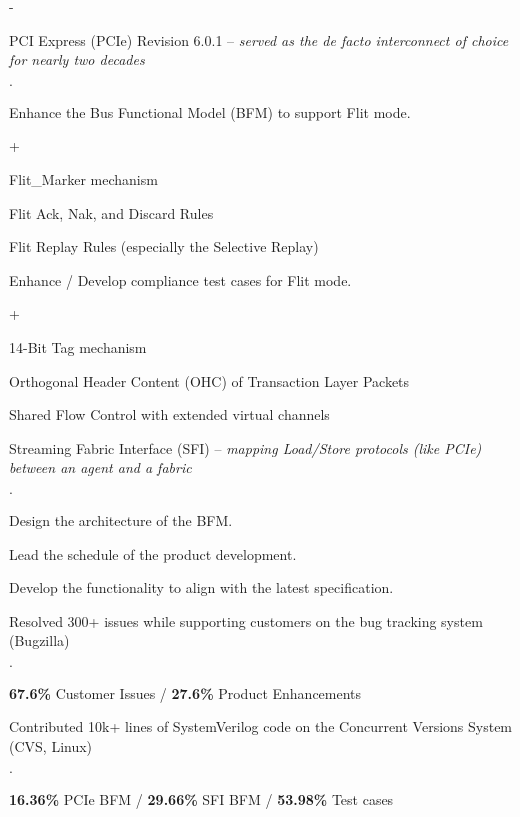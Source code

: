 \documentclass{cvclass}
\begin{document}
\begin{plainitemize}{-}
    \item PCI Express\textsuperscript{\tiny\textregistered} (PCIe) Revision 6.0.1 -- \textit{served as the de facto interconnect of choice for nearly two decades}
    \begin{plainitemize}{\(\cdot\)}
        \item Enhance the Bus Functional Model (BFM) to support Flit mode.
        \begin{plainitemize}{+}
            \item Flit\_Marker mechanism
            \item Flit Ack, Nak, and Discard Rules
            \item Flit Replay Rules (especially the Selective Replay)
        \end{plainitemize}
        \item Enhance / Develop compliance test cases for Flit mode.
        \begin{plainitemize}{+}
            \item 14-Bit Tag mechanism
            \item Orthogonal Header Content (OHC) of Transaction Layer Packets
            \item Shared Flow Control with extended virtual channels
        \end{plainitemize}
    \end{plainitemize}
    \item Streaming Fabric Interface (SFI) -- \textit{mapping Load/Store protocols (like PCIe) between an agent and a fabric}
    \begin{plainitemize}{\(\cdot\)}
        \item Design the architecture of the BFM.
        \item Lead the schedule of the product development.
        \item Develop the functionality to align with the latest specification.
    \end{plainitemize}
    \item Resolved 300+ issues while supporting customers on the bug tracking system (Bugzilla)
    \begin{plainitemize}{\(\cdot\)}
        \item {\textbf{67.6\%} Customer Issues / \textbf{27.6\%} Product Enhancements}
    \end{plainitemize}
    \item Contributed 10k+ lines of SystemVerilog code on the Concurrent Versions System (CVS, Linux)
    \begin{plainitemize}{\(\cdot\)}
        \item \textbf{16.36\%} PCIe BFM / \textbf{29.66\%} SFI BFM / \textbf{53.98\%} Test cases
    \end{plainitemize}
\end{plainitemize}
\end{document}
